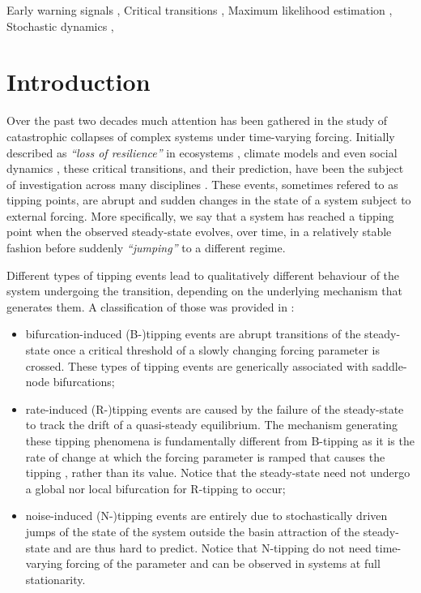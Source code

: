 \documentclass[a4paper,fleqn]{cas-sc}
\begin{document}
\begin{keywords}
Early warning signals \sep 
Critical transitions \sep
Maximum likelihood estimation \sep
Stochastic dynamics \sep
\end{keywords}

\maketitle

\section{Introduction}
Over the past two decades much attention has been gathered in the study of catastrophic collapses of complex systems under time-varying forcing.
Initially described as \textit{``loss of resilience''} in ecosystems \cite{Ives1995, Scheffer2009}, climate models \cite{Lenton2012} and even social dynamics \cite{Scheffer2021}, these critical transitions, and their prediction, have been the subject of investigation across many disciplines \cite{Feng2014,Liang2017,Xu2023}.
These events, sometimes refered to as tipping points, are abrupt and sudden changes in the state of a system subject to external forcing.
More specifically, we say that a system has reached a tipping point when the observed steady-state evolves, over time, in a relatively stable fashion before suddenly \textit{``jumping''} to a different regime.

Different types of tipping events lead to qualitatively different behaviour of the system undergoing the transition, depending on the underlying mechanism that generates them. 
A classification of those was provided in \cite{Ashwin2012}:
%
\begin{itemize}
        \item bifurcation-induced (B-)tipping events are abrupt transitions of the steady-state once a critical threshold of a slowly changing forcing parameter is crossed. These types of tipping events are generically associated with saddle-node bifurcations;
     \item rate-induced (R-)tipping events are caused by the failure of the steady-state to track the drift of a quasi-steady equilibrium. The mechanism generating these tipping phenomena is fundamentally different from B-tipping as it is the rate of change at which the forcing parameter is ramped that causes the tipping \cite{Ashwin2017}, rather than its value. Notice that the steady-state need not undergo a global nor local bifurcation for R-tipping to occur;
     \item noise-induced (N-)tipping events are entirely due to stochastically driven jumps of the state of the system outside the basin attraction of the steady-state and are thus hard to predict. Notice that N-tipping do not need time-varying forcing of the parameter and can be observed in systems at full stationarity.
\end{itemize}
\end{document}
